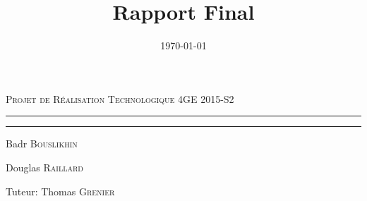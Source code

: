 \title{Rapport Final}
\date{\today}


\begin{titlepage}
	\begin{center}
		
		\textsc{\Large Projet de Réalisation Technologique 4GE 2015-S2}
		\vfill
		
		\hrule
		\bigskip
		\huge\bfseries\thetitle{}
		\bigskip
		\hrule
		
		
		\bigskip
		\noindent
		\begin{minipage}{0.4\textwidth}
			\begin{flushleft}
				\large
				Badr \textsc{Bouslikhin}
			\end{flushleft}
		\end{minipage}%
		\begin{minipage}{0.4\textwidth}
			\begin{flushright} \large
				Douglas \textsc{Raillard}
			\end{flushright}
		\end{minipage}
		\begin{minipage}{\textwidth}
			\begin{center} \large
				Tuteur: Thomas \textsc{Grenier}
			\end{center}
		\end{minipage}
		
		
		\vfill

        {\large \thedate}
		
	\end{center}
\end{titlepage}

